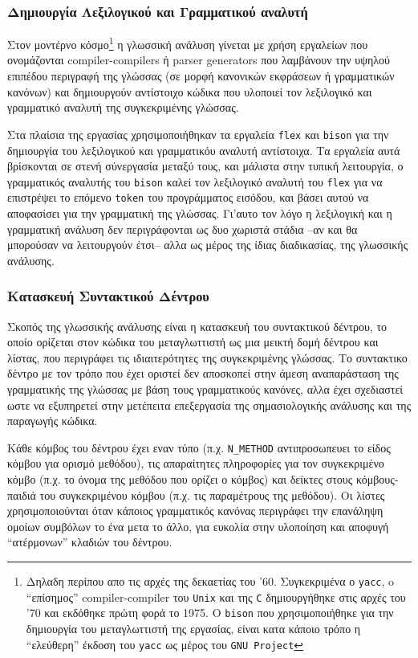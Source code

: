 \documentclass[a4paper,11pt]{article}
\newcommand{\eng}[1]{\foreignlanguage{english}{#1}}
\newcommand{\tech}[1]{\foreignlanguage{english}{\texttt{#1}}}
\begin{document}
\subsubsection{Δημιουργία Λεξιλογικού και Γραμματικού αναλυτή}
Στον μοντέρνο κόσμο\footnote{
	Δηλαδη περίπου απο τις αρχές της δεκαετίας του '60. 
	Συγκεκριμένα ο \tech{yacc}, o \enquote{επίσημος} \eng{compiler-compiler} του \tech{Unix} 
	και της \tech{C} δημιουργήθηκε στις αρχές του '70 και εκδόθηκε πρώτη φορά το 1975.  
	Ο \tech{bison} που χρησιμοποιήθηκε για την δημιουργία του μεταγλωττιστή της εργασίας, 
	είναι κατα κάποιο τρόπο η \enquote{ελεύθερη} έκδοση του \tech{yacc} ως μέρος του 
	\tech{GNU Project}
} η γλωσσική ανάλυση γίνεται με χρήση εργαλείων που ονομάζονται \eng{compiler-compilers} ή
\eng{parser generators} που λαμβάνουν την υψηλού επιπέδου περιγραφή της γλώσσας (σε μορφή
κανονικών εκφράσεων ή γραμματικών κανόνων) και δημιουργούν αντίστοιχο κώδικα που
υλοποιεί τον λεξιλογικό και γραμματικό αναλυτή της συγκεκριμένης γλώσσας.

Στα πλαίσια της εργασίας χρησιμοποιήθηκαν τα εργαλεία \tech{flex} και \tech{bison} 
για την δημιουργία του λεξιλογικού και γραμματικόυ αναλυτή αντίστοιχα. 
Τα εργαλεία αυτά βρίσκονται σε στενή σύνεργασία μεταξύ τους, και
μάλιστα στην τυπική λειτουργία, ο γραμματικός αναλυτής του \tech{bison} καλεί τον
λεξιλογικό αναλυτή του \tech{flex} για να επιστρέψει το επόμενο \tech{token} του
προγράμματος εισόδου, και βάσει αυτού να αποφασίσει για την γραμματική της γλώσσας.
Γι'αυτο τον λόγο η λεξιλογική και η γραμματική ανάλυση δεν περιγράφονται ως δυο χωριστά
στάδια --αν και θα μπορούσαν να λειτουργούν έτσι-- αλλα ως μέρος της ίδιας διαδικασίας,
της γλωσσικής ανάλυσης.

\subsubsection{Κατασκευή Συντακτικού Δέντρου}
Σκοπός της γλωσσικής ανάλυσης είναι η κατασκευή του συντακτικού δέντρου, το οποίο ορίζεται
στον κώδικα του μεταγλωττιστή ως μια μεικτή δομή δέντρου και λίστας, που περιγράφει τις
ιδιαιτερότητες της συγκεκριμένης γλώσσας. Το συντακτικο δέντρο με τον τρόπο που έχει
οριστεί δεν αποσκοπεί στην άμεση αναπαράσταση της γραμματικής της γλώσσας με βάση τους
γραμματικούς κανόνες, αλλα έχει σχεδιαστεί ωστε να εξυπηρετεί στην μετέπειτα επεξεργασία
της σημασιολογικής ανάλυσης και της παραγωγής κώδικα.

Κάθε κόμβος του δέντρου έχει εναν τύπο (π.χ. \tech{N\_METHOD} αντιπροσωπευει το είδος κόμβου
για ορισμό μεθόδου), τις απαραίτητες πληροφορίες για τον συγκεκριμένο κόμβο (π.χ. το όνομα
της μεθόδου που ορίζει ο κόμβος) και δείκτες στους κόμβους-παιδιά του συγκεκριμένου κόμβου
(π.χ. τις παραμέτρους της μεθόδου). Οι λίστες χρησιμοποιούνται όταν κάποιος γραμματικός
κανόνας περιγράφει την επανάληψη ομοίων συμβόλων το ένα μετα το άλλο, για ευκολία στην
υλοποίηση και αποφυγή \enquote{ατέρμονων} κλαδιών του δέντρου.
\end{document}

